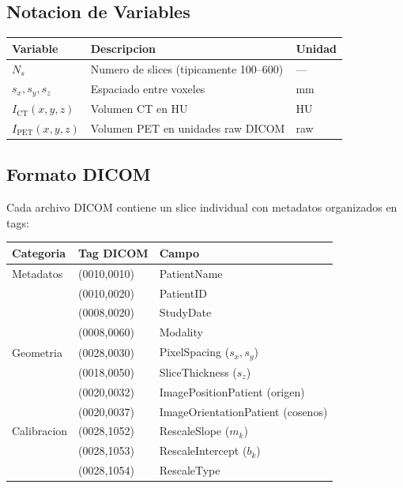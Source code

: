 \documentclass[12pt,a4paper]{article}
\begin{document}
\subsection{Notacion de Variables}

\begin{table}[H]
\centering
\begin{tabular}{lll}
\toprule
\textbf{Variable} & \textbf{Descripcion} & \textbf{Unidad} \\
\midrule
$N_s$ & Numero de slices (tipicamente 100--600) & --- \\
$s_x, s_y, s_z$ & Espaciado entre voxeles & mm \\
$I_{\text{CT}}(x,y,z)$ & Volumen CT en HU & HU \\
$I_{\text{PET}}(x,y,z)$ & Volumen PET en unidades raw DICOM & raw \\
\bottomrule
\end{tabular}
\end{table}

\subsection{Formato DICOM}

Cada archivo DICOM contiene un slice individual con metadatos organizados en tags:

\begin{table}[H]
\centering
\begin{tabular}{lll}
\toprule
\textbf{Categoria} & \textbf{Tag DICOM} & \textbf{Campo} \\
\midrule
Metadatos & (0010,0010) & PatientName \\
 & (0010,0020) & PatientID \\
 & (0008,0020) & StudyDate \\
 & (0008,0060) & Modality \\
Geometria & (0028,0030) & PixelSpacing ($s_x, s_y$) \\
 & (0018,0050) & SliceThickness ($s_z$) \\
 & (0020,0032) & ImagePositionPatient (origen) \\
 & (0020,0037) & ImageOrientationPatient (cosenos) \\
Calibracion & (0028,1052) & RescaleSlope ($m_k$) \\
 & (0028,1053) & RescaleIntercept ($b_k$) \\
 & (0028,1054) & RescaleType \\
\bottomrule
\end{tabular}
\end{table}
\end{document}
